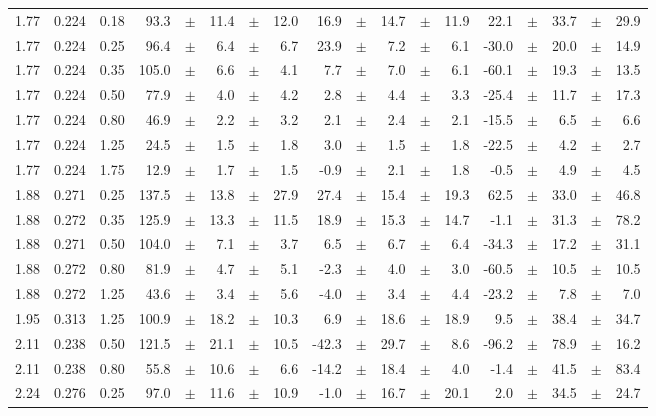 \documentclass[prc,aps,floatfix,showpacs,showkeys,twocolumn,superscriptaddress,letterpaper,10pt]{revtex4-1}
\begin{document}
\begin{widetext}
\begin{longtable}{ccc@{\extracolsep{1cm}}d@{\extracolsep{0pt}}cdcd@{\extracolsep{1cm}}d@{\extracolsep{0pt}}cdcd@{\extracolsep{1cm}}d@{\extracolsep{0pt}}cdcd}
1.77 & 0.224 & 0.18 & 93.3 &	$\pm$ & 11.4 &	$\pm$ & 12.0 & 16.9 &	$\pm$ & 14.7 &	$\pm$ & 11.9 & 22.1 &	$\pm$ & 33.7 &	$\pm$ & 29.9\\
1.77 & 0.224 & 0.25 & 96.4 &	$\pm$ & 6.4 &	$\pm$ & 6.7 & 23.9 &	$\pm$ & 7.2 &	$\pm$ & 6.1 & -30.0 &	$\pm$ & 20.0 &	$\pm$ & 14.9\\
1.77 & 0.224 & 0.35 & 105.0 &	$\pm$ & 6.6 &	$\pm$ & 4.1 & 7.7 &	$\pm$ & 7.0 &	$\pm$ & 6.1 & -60.1 &	$\pm$ & 19.3 &	$\pm$ & 13.5\\
1.77 & 0.224 & 0.50 & 77.9 &	$\pm$ & 4.0 &	$\pm$ & 4.2 & 2.8 &	$\pm$ & 4.4 &	$\pm$ & 3.3 & -25.4 &	$\pm$ & 11.7 &	$\pm$ & 17.3\\
1.77 & 0.224 & 0.80 & 46.9 &	$\pm$ & 2.2 &	$\pm$ & 3.2 & 2.1 &	$\pm$ & 2.4 &	$\pm$ & 2.1 & -15.5 &	$\pm$ & 6.5 &	$\pm$ & 6.6\\
1.77 & 0.224 & 1.25 & 24.5 &	$\pm$ & 1.5 &	$\pm$ & 1.8 & 3.0 &	$\pm$ & 1.5 &	$\pm$ & 1.8 & -22.5 &	$\pm$ & 4.2 &	$\pm$ & 2.7\\
1.77 & 0.224 & 1.75 & 12.9 &	$\pm$ & 1.7 &	$\pm$ & 1.5 & -0.9 &	$\pm$ & 2.1 &	$\pm$ & 1.8 & -0.5 &	$\pm$ & 4.9 &	$\pm$ & 4.5\\
1.88 & 0.271 & 0.25 & 137.5 &	$\pm$ & 13.8 &	$\pm$ & 27.9 & 27.4 &	$\pm$ & 15.4 &	$\pm$ & 19.3 & 62.5 &	$\pm$ & 33.0 &	$\pm$ & 46.8\\
1.88 & 0.272 & 0.35 & 125.9 &	$\pm$ & 13.3 &	$\pm$ & 11.5 & 18.9 &	$\pm$ & 15.3 &	$\pm$ & 14.7 & -1.1 &	$\pm$ & 31.3 &	$\pm$ & 78.2\\
1.88 & 0.271 & 0.50 & 104.0 &	$\pm$ & 7.1 &	$\pm$ & 3.7 & 6.5 &	$\pm$ & 6.7 &	$\pm$ & 6.4 & -34.3 &	$\pm$ & 17.2 &	$\pm$ & 31.1\\
1.88 & 0.272 & 0.80 & 81.9 &	$\pm$ & 4.7 &	$\pm$ & 5.1 & -2.3 &	$\pm$ & 4.0 &	$\pm$ & 3.0 & -60.5 &	$\pm$ & 10.5 &	$\pm$ & 10.5\\
1.88 & 0.272 & 1.25 & 43.6 &	$\pm$ & 3.4 &	$\pm$ & 5.6 & -4.0 &	$\pm$ & 3.4 &	$\pm$ & 4.4 & -23.2 &	$\pm$ & 7.8 &	$\pm$ & 7.0\\
1.95 & 0.313 & 1.25 & 100.9 &	$\pm$ & 18.2 &	$\pm$ & 10.3 & 6.9 &	$\pm$ & 18.6 &	$\pm$ & 18.9 & 9.5 &	$\pm$ & 38.4 &	$\pm$ & 34.7\\
2.11 & 0.238 & 0.50 & 121.5 &	$\pm$ & 21.1 &	$\pm$ & 10.5 & -42.3 &	$\pm$ & 29.7 &	$\pm$ & 8.6 & -96.2 &	$\pm$ & 78.9 &	$\pm$ & 16.2\\
2.11 & 0.238 & 0.80 & 55.8 &	$\pm$ & 10.6 &	$\pm$ & 6.6 & -14.2 &	$\pm$ & 18.4 &	$\pm$ & 4.0 & -1.4 &	$\pm$ & 41.5 &	$\pm$ & 83.4\\
2.24 & 0.276 & 0.25 & 97.0 &	$\pm$ & 11.6 &	$\pm$ & 10.9 & -1.0 &	$\pm$ & 16.7 &	$\pm$ & 20.1 & 2.0 &	$\pm$ & 34.5 &	$\pm$ & 24.7\\

\end{longtable}
\end{widetext}
\end{document}

